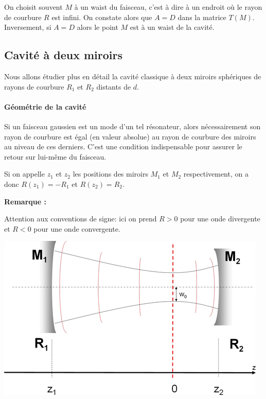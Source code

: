 \documentclass{book}
\begin{document}
On choisit souvent \(M\) à un waist du faisceau, c'est à dire à un endroit où le rayon de courbure \(R\) est infini. On constate alors que \(A=D\) dans la matrice \(T(M)\). Inversement, si \(A=D\) alors le point \(M\) est à un waist de la cavité.

\subsection{Cavité à deux miroirs}

Nous allons étudier plus en détail la cavité classique à deux miroirs sphériques de rayons de courbure \(R_1\) et \(R_2\) distants de \(d\).


\paragraph{Géométrie de la cavité}

Si un faisceau gaussien est un mode d'un tel résonateur, alors nécessairement son rayon de courbure est égal (en valeur absolue) au rayon de courbure des miroirs au niveau de ces derniers. C'est une condition indispensable pour assurer le retour sur lui-même du faisceau.

Si on appelle \(z_1\) et \(z_2\) les positions des miroirs \(M_1\) et \(M_2\) respectivement, on a donc \(R(z_1) = -R_1\) et \(R(z_2) = R_2\).

\textbf{\color{remarque1}Remarque :}  
\begin{mdframed}[linecolor=remarque1, backgroundcolor=remarque2]

Attention aux conventions de signe: ici on prend \(R>0\) pour une onde divergente et \(R<0\) pour une onde convergente.

\end{mdframed}


{\centering
\includegraphics[scale=1.7]{images/fig16.jpg}
\par}
\end{document}
